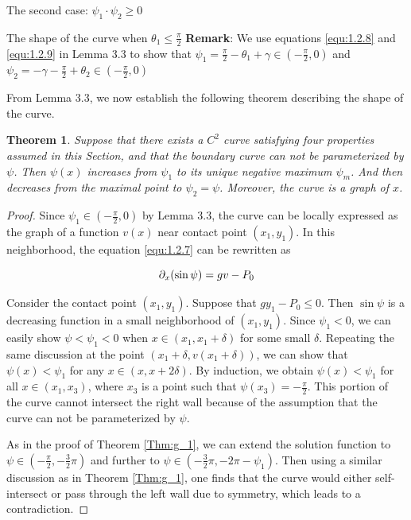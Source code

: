 \documentclass[letterpaper,reqno,10pt,twoside]{amsart}
\newtheorem{theorem}{Theorem}[section]
\theoremstyle{definition}
\theoremstyle{remark}
\begin{document}
\begin{section}{The second case: $\psi_1\cdot \psi_2\geq 0$ }
\begin{subsection}{The shape of the curve when $\theta_1\leq \frac{\pi}{2}$}
    \textbf{Remark}: We use equations \eqref{equ:1.2.8} and \eqref{equ:1.2.9} in Lemma 3.3 to show that $\psi_1=\frac{\pi}{2}-\theta_1+\gamma\in(-\frac{\pi}{2},0)$ and $\psi_2=-\gamma-\frac{\pi}{2}+\theta_2\in(-\frac{\pi}{2},0)$
    
   From Lemma 3.3, we now establish the following theorem describing the shape of the curve.

    \begin{theorem}

          Suppose that there exists a $C^{2}$ curve satisfying four properties assumed in this Section, and that the boundary curve can not be parameterized by $\psi$. Then $\psi(x)$  increases from $\psi_1$ to its unique negative maximum $\psi_m$. And then decreases from the maximal point to $\psi_{2}=\psi$. Moreover, the curve is a graph of $x$.
        
    \end{theorem}

    \begin{proof}

        Since $\psi_1\in(-\frac{\pi}{2},0)$ by Lemma 3.3, the curve can be locally expressed as the graph of a function $v(x)$ near contact point $(x_{1},y_{1})$. In this neighborhood, the equation \eqref{equ:1.2.7} can be rewritten as

        \begin{equation}{\label{equ:3.3.16}}
            \partial_{x}(\sin\psi)=gv-P_{0}
        \end{equation}

        \noindent Consider the contact point $(x_{1},y_{1})$. Suppose that $gy_1-P_{0}\leq 0$. Then $\sin\psi$ is a decreasing function in a small neighborhood of $(x_1,y_1)$. Since $\psi_1<0$, we can easily show $\psi<\psi_1<0$ when $x\in (x_1,x_1+\delta)$ for some small $\delta$.  Repeating the same discussion at the point $(x_1+\delta,v(x_1+\delta))$, we can show that $\psi(x)<\psi_1$ for any $x\in (x,x+2\delta)$. By induction, we obtain $\psi(x)<\psi_1$ for all $x\in (x_1,x_3)$, where $x_{3}$ is a point such that $\psi(x_3)=-\frac{\pi}{2}$.  This portion of the curve cannot intersect the right wall because of the assumption that the curve can not be parameterized by $\psi$.

         As in the proof of Theorem \ref{Thm:g_1}, we can extend the solution function to $\psi\in (-\frac{\pi}{2},-\frac{3}{2}\pi)$ and further to $\psi\in (-\frac{3}{2}\pi,-2\pi-\psi_1)$. Then using a similar discussion as in Theorem \ref{Thm:g_1}, one finds that the curve would either self-intersect or pass through the left wall due to symmetry, which leads to a contradiction.


\end{proof}
\end{subsection}
\end{section}
\end{document}
